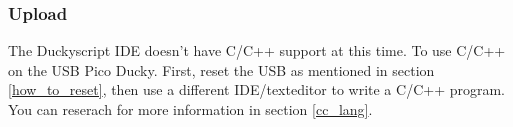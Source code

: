\documentclass[a4paper,12pt]{article}
\begin{document}
\subsubsection{Upload}

The Duckyscript IDE doesn't have C/C++ support at this time. To use C/C++ on the USB Pico Ducky. First, reset the USB as mentioned in section \ref{how_to_reset}, then use a different IDE/texteditor to write a C/C++ program. You can reserach for more information in section \ref{cc_lang}.

\newpage
\end{document}
